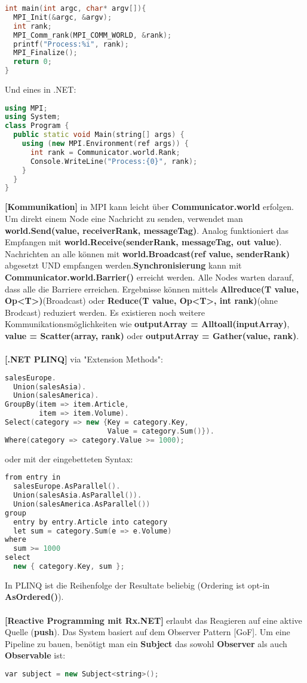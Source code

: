 \documentclass[8pt]{extarticle}
\let\oldtextbf\textbf
\renewcommand{\textbf}{\tiny\oldtextbf}
\begin{document}
\begin{multicols*}{5}
\begin{lstlisting}[language=c]
int main(int argc, char* argv[]){
  MPI_Init(&argc, &argv);
  int rank;
  MPI_Comm_rank(MPI_COMM_WORLD, &rank);
  printf("Process:%i", rank);
  MPI_Finalize();
  return 0;
}
\end{lstlisting}
Und eines in .NET:
\begin{lstlisting}[language=c++]
using MPI;
using System;
class Program {
  public static void Main(string[] args) {
    using (new MPI.Environment(ref args)) {
      int rank = Communicator.world.Rank;
      Console.WriteLine("Process:{0}", rank);
    }
  }
}
\end{lstlisting}
\textbf{[Kommunikation]} in MPI kann leicht über \textbf{Communicator.world} erfolgen. Um direkt einem Node eine Nachricht zu senden, verwendet man \textbf{world.Send(value, receiverRank, messageTag)}. Analog funktioniert das Empfangen mit \textbf{world.Receive(senderRank, messageTag, out value)}. Nachrichten an alle können mit \textbf{world.Broadcast(ref value, senderRank)} abgesetzt UND empfangen werden.\textbf{Synchronisierung} kann mit \textbf{Communicator.world.Barrier()} erreicht werden. Alle Nodes warten darauf, dass alle die Barriere erreichen. Ergebnisse können mittels \textbf{Allreduce(T value, Op<T>)}(Broadcast) oder \textbf{Reduce(T value, Op<T>, int rank)}(ohne Brodcast) reduziert werden. Es existieren noch weitere Kommunikationsmöglichkeiten wie \textbf{outputArray = Alltoall(inputArray)}, \textbf{value = Scatter(array, rank)} oder \textbf{outputArray = Gather(value, rank)}.\\\\
\textbf{[.NET PLINQ]} via "Extension Methods":
\begin{lstlisting}[language=c++]
salesEurope.
  Union(salesAsia).
  Union(salesAmerica).
GroupBy(item => item.Article,
        item => item.Volume).
Select(category => new {Key = category.Key,
                        Value = category.Sum()}).
Where(category => category.Value >= 1000);
\end{lstlisting}
oder mit der eingebetteten Syntax:
\begin{lstlisting}[language=c++]
from entry in
  salesEurope.AsParallel().
  Union(salesAsia.AsParallel()).
  Union(salesAmerica.AsParallel())
group
  entry by entry.Article into category
  let sum = category.Sum(e => e.Volume)
where
  sum >= 1000
select
  new { category.Key, sum };
\end{lstlisting}
In PLINQ ist die Reihenfolge der Resultate beliebig (Ordering ist opt-in \textbf{AsOrdered()}).\\\\
\textbf{[Reactive Programming mit Rx.NET]} erlaubt das Reagieren auf eine aktive Quelle (\textbf{push}). Das System basiert auf dem Observer Pattern [GoF]. Um eine Pipeline zu bauen, benötigt man ein \textbf{Subject} das sowohl \textbf{Observer} als auch \textbf{Observable} ist:
\begin{lstlisting}[language=c++]
var subject = new Subject<string>();


\end{lstlisting}
\end{multicols*}
\end{document}
